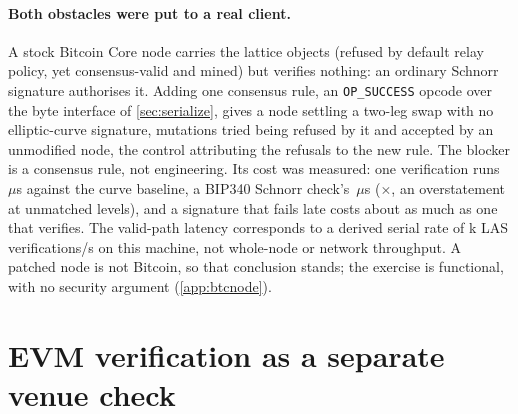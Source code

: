 \paragraph{Both obstacles were put to a real client.} A stock Bitcoin Core node carries the
lattice objects (refused by default relay policy, yet consensus-valid and mined) but
verifies nothing: an ordinary Schnorr signature authorises it. Adding one consensus
rule, an \texttt{OP\_SUCCESS} opcode \cite{bip342} over the byte interface of
\cref{sec:serialize}, gives a node settling a two-leg swap with no elliptic-curve
signature, \btcSwapControls{} mutations tried being refused by it and accepted by an
unmodified node, the control attributing the refusals to the new rule. The blocker is a consensus rule, not
engineering. Its cost was measured: one verification runs
\btcLasVerifyUs\,$\mu$s against the curve baseline, a BIP340 Schnorr
check's \btcSchnorrVerifyUs\,$\mu$s (\btcLasRatioSchnorr$\times$, an overstatement at
unmatched levels), and a signature that
fails late costs about as much as one that verifies. The valid-path latency corresponds to a
derived serial rate of \btcLasSerialRateK{}k LAS verifications/s on this machine, not
whole-node or network throughput. A patched node is not Bitcoin, so that
conclusion stands; the exercise is functional, with no security argument (\cref{app:btcnode}).

\FloatBarrier
\section{EVM verification as a separate venue check}
\label{sec:res-evm}

\begingroup
\setlength{\intextsep}{6pt}
\setlength{\abovecaptionskip}{3pt}
\setlength{\belowcaptionskip}{0pt}

